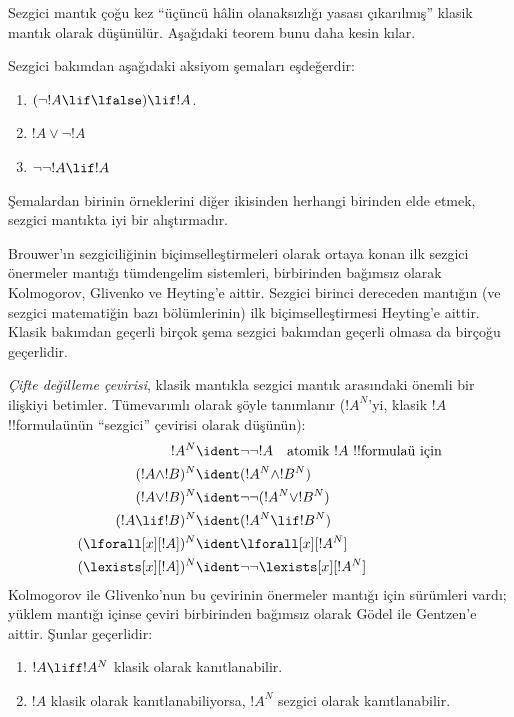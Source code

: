 \documentclass[../../../include/open-logic-section]{subfiles}
\begin{document}
Sezgici mantık çoğu kez ``üçüncü hâlin olanaksızlığı yasası çıkarılmış'' klasik
mantık olarak düşünülür. Aşağıdaki teorem bunu daha kesin kılar.
\begin{thm}
Sezgici bakımdan aşağıdaki aksiyom şemaları eşdeğerdir:
\begin{enumerate}
\item $(\lnot !A \lif \lfalse) \lif !A$.
\item $!A \lor \lnot !A$
\item $\lnot \lnot !A \lif !A$
\end{enumerate}
\end{thm}
Şemalardan birinin örneklerini diğer ikisinden herhangi birinden elde etmek,
sezgici mantıkta iyi bir alıştırmadır.

Brouwer'ın sezgiciliğinin biçimselleştirmeleri olarak ortaya konan ilk sezgici
önermeler mantığı tümdengelim sistemleri, birbirinden bağımsız olarak
Kolmogorov, Glivenko ve Heyting'e aittir. Sezgici birinci dereceden mantığın
(ve sezgici matematiğin bazı bölümlerinin) ilk biçimselleştirmesi Heyting'e
aittir. Klasik bakımdan geçerli birçok şema sezgici bakımdan geçerli olmasa da
birçoğu geçerlidir.

\emph{Çifte değilleme çevirisi}, klasik mantıkla sezgici mantık arasındaki
önemli bir ilişkiyi betimler. Tümevarımlı olarak şöyle tanımlanır ($!A^N$'yi,
klasik $!A$ !!{formula}{}ünün ``sezgici'' çevirisi olarak düşünün):
\begin{align*}
!A^N & \ident \lnot\lnot !A \quad \text{atomik $!A$ !!{formula}{}ü için} \\
(!A \land !B)^N & \ident (!A^N \land !B^N) \\
(!A \lor !B)^N & \ident  \lnot\lnot (!A^N \lor !B^N) \\
(!A \lif !B)^N & \ident (!A^N \lif !B^N) \\
(\lforall[x][!A])^N & \ident \lforall[x][!A^N] \\
(\lexists[x][!A])^N & \ident \lnot\lnot\lexists[x][!A^N]
\end{align*}
Kolmogorov ile Glivenko'nun bu çevirinin önermeler mantığı için sürümleri
vardı; yüklem mantığı içinse çeviri birbirinden bağımsız olarak G\"odel ile
Gentzen'e aittir. Şunlar geçerlidir:

\begin{thm}
\begin{enumerate}
\item $!A \liff !A^N$ klasik olarak kanıtlanabilir.
\item $!A$ klasik olarak kanıtlanabiliyorsa, $!A^N$ sezgici olarak
  kanıtlanabilir.
\end{enumerate}
\end{thm}
\end{document}
